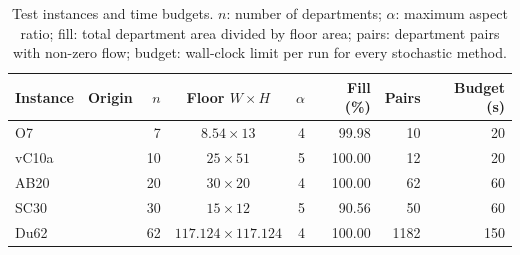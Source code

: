 \begin{table}[tbp]
\centering
\caption{Test instances and time budgets. $n$: number of departments; $\alpha$: maximum aspect ratio;
fill: total department area divided by floor area; pairs: department pairs with non-zero flow;
budget: wall-clock limit per run for every stochastic method.}
\label{tab:bx-setup}
\small
\begin{tabular}{llrcrrrr}
\toprule
Instance & Origin & $n$ & Floor $W\times H$ & $\alpha$ & Fill (\%) & Pairs & Budget (s)\\
\midrule
O7 & \cite{meller1998} & 7 & $8.54\times13$ & 4 & 99.98 & 10 & 20 \\
vC10a & \cite{vancamp1992} & 10 & $25\times51$ & 5 & 100.00 & 12 & 20 \\
AB20 & \cite{armour1963} & 20 & $30\times20$ & 4 & 100.00 & 62 & 60 \\
SC30 & \cite{liu2007} & 30 & $15\times12$ & 5 & 90.56 & 50 & 60 \\
Du62 & \cite{dunker2003} & 62 & $117.124\times117.124$ & 4 & 100.00 & 1182 & 150 \\
\bottomrule
\end{tabular}
\end{table}
